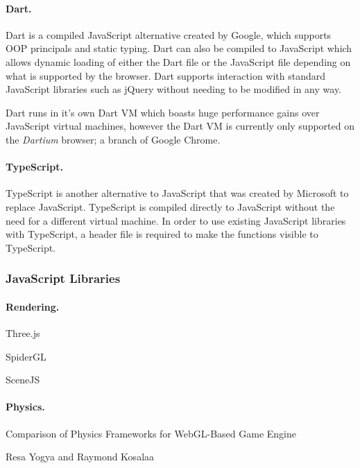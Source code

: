 \documentclass[a4paper, 12pt]{article}
\begin{document}
\paragraph{Dart.}
Dart is a compiled JavaScript alternative created by Google, which supports OOP principals and static typing. Dart can also be compiled to JavaScript which allows dynamic loading of either the Dart file or the JavaScript file depending on what is supported by the browser. Dart supports interaction with standard JavaScript libraries such as jQuery without needing to be modified in any way.

Dart runs in it's own Dart VM which boasts huge performance gains over JavaScript virtual machines, however the Dart VM is currently only supported on the \emph{Dartium} browser; a branch of Google Chrome.


\paragraph{TypeScript.}
TypeScript is another alternative to JavaScript that was created by Microsoft to replace JavaScript. TypeScript is compiled directly to JavaScript without the need for a different virtual machine. In order to use existing JavaScript libraries with TypeScript, a header file is required to make the functions visible to TypeScript.


\subsubsection{JavaScript Libraries}

\paragraph{Rendering.}
Three.js

SpiderGL

SceneJS

\paragraph{Physics.}
Comparison of Physics Frameworks for WebGL-Based Game Engine 

Resa Yogya and Raymond Kosalaa

\end{document}
